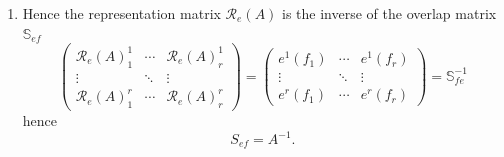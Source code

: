 \documentclass[aps,preprint]{revtex4}
\begin{document}
\begin{enumerate}
\begin{enumerate}
\item Hence the representation matrix $\mathcal{R}_{e}\left( A\right) $ is
the inverse of the overlap matrix $\mathbb{S}_{ef}$ 
\begin{equation}
\left( 
\begin{array}{ccc}
\mathcal{R}_{e}\left( A\right) _{1}^{1} & \cdots & \mathcal{R}_{e}\left(
A\right) _{r}^{1} \\ 
\vdots & \ddots & \vdots \\ 
\mathcal{R}_{e}\left( A\right) _{1}^{r} & \cdots & \mathcal{R}_{e}\left(
A\right) _{r}^{r}%
\end{array}%
\right) =\left( 
\begin{array}{ccc}
e^{1}\left( f_{1}\right) & \cdots & e^{1}\left( f_{r}\right) \\ 
\vdots & \ddots & \vdots \\ 
e^{r}\left( f_{1}\right) & \cdots & e^{r}\left( f_{r}\right)%
\end{array}%
\right) =\mathbb{S}_{fe}^{-1}
\end{equation}%
hence 
\begin{equation}
S_{ef}=A^{-1}.
\end{equation}


\end{enumerate}
\end{enumerate}
\end{document}
